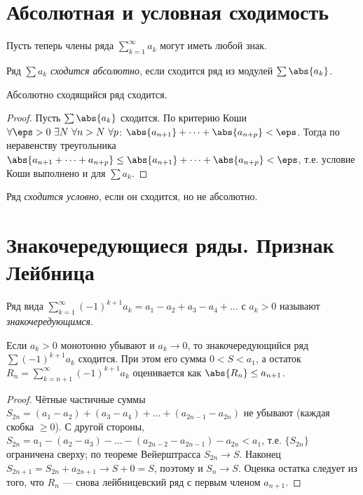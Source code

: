 \section{Абсолютная и условная сходимость}

Пусть теперь члены ряда $\displaystyle\sum_{k=1}^\infty a_k$ могут иметь любой знак.

\begin{definition}
Ряд $\sum a_k$ \emph{сходится абсолютно}, если сходится ряд из модулей $\sum\abs{a_k}$.
\end{definition}

\begin{theorem}
Абсолютно сходящийся ряд сходится.
\end{theorem}

\begin{proof}
Пусть $\sum\abs{a_k}$ сходится. По критерию Коши $\forall\eps>0\ \exists N\ \forall n>N\ \forall
p$: $\abs{a_{n+1}}+\dots+\abs{a_{n+p}}<\eps$. Тогда по неравенству треугольника
$\abs{a_{n+1}+\dots+a_{n+p}}\le\abs{a_{n+1}}+\dots+\abs{a_{n+p}}<\eps$, т.е. условие Коши
выполнено и для $\sum a_k$.
\end{proof}

\begin{definition}
Ряд \emph{сходится условно}, если он сходится, но не абсолютно.
\end{definition}

\section{Знакочередующиеся ряды. Признак Лейбница}

\begin{definition}
Ряд вида $\displaystyle\sum_{k=1}^\infty(-1)^{k+1}a_k=a_1-a_2+a_3-a_4+\dots$ с $a_k>0$ называют
\emph{знакочередующимся}.
\end{definition}

\begin{theorem}[Лейбниц]
Если $a_k>0$ монотонно убывают и $a_k\to0$, то знакочередующийся ряд
$\sum(-1)^{k+1}a_k$ сходится. При этом его сумма $0<S<a_1$, а остаток
$\displaystyle R_n=\sum_{k=n+1}^\infty(-1)^{k+1}a_k$ оценивается как $\abs{R_n}\le a_{n+1}$.
\end{theorem}

\begin{proof}
Чётные частичные суммы $S_{2n}=(a_1-a_2)+(a_3-a_4)+\dots+(a_{2n-1}-a_{2n})$ не убывают (каждая
скобка $\ge0$). С другой стороны, $S_{2n}=a_1-(a_2-a_3)-\dots-(a_{2n-2}-a_{2n-1})-a_{2n}<a_1$,
т.е. $\{S_{2n}\}$ ограничена сверху; по теореме Вейерштрасса $S_{2n}\to S$. Наконец
$S_{2n+1}=S_{2n}+a_{2n+1}\to S+0=S$, поэтому и $S_n\to S$. Оценка остатка следует из того, что
$R_n$ — снова лейбницевский ряд с первым членом $a_{n+1}$.
\end{proof}

